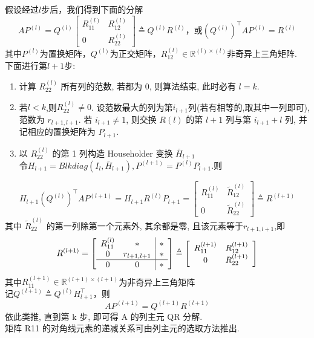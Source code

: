\documentclass[12pt,a4paper]{article}
\begin{document}
假设经过$l$步后，我们得到下面的分解
$$
A P^{(l)}=Q^{(l)}\left[\begin{array}{cc}{R_{11}^{(l)}} & {R_{12}^{(l)}} \\ {0} & {R_{22}^{(l)}}\end{array}\right] \triangleq Q^{(l)} R^{(l)}，或 \left(Q^{(l)}\right)^{\top} A P^{(l)}=R^{(l)}
$$
其中$P^(l)$为置换矩阵，$Q^(l)$为正交矩阵，$R_{12}^{(l)} \in \mathbb{R}^{(l) \times(l)}$非奇异上三角矩阵.\\
下面进行第$l+1$步:
\begin{enumerate}
\item 计算 $R_{22}^{(l)}$ 所有列的范数, 若都为 0, 则算法结束, 此时必有 $l = k$.
\item 若$l < k$,则$R_{22}^{(l)}\ne 0$. 设范数最大的列为第$i_{l+1}$列(若有相等的,取其中一列即可), 范数为 $r_{l+1,l+1}$. 若 $i_{l+1}\ne 1$, 则交换 $R(l)$ 的第 $l + 1$ 列与第 $i_{l+1} + l$ 列, 并记相应的置换矩阵为 $P_{l+1}$.
\item 以 $R_{22}^{(l)}$ 的第 1 列构造 Householder 变换 $\bar{H}_{l+1}$\\
令$H_{l+1}=Blkdiag(I_{l},\bar{H}_{l+1}),P^{(l+1)}=P^{(l)} P_{l+1}$.则
\end{enumerate}
$$
H_{l+1}\left(Q^{(l)}\right)^{\top} A P^{(l+1)}=H_{l+1} R^{(l)} P_{l+1}=\left[\begin{array}{cc}{R_{11}^{(l)}} & {\tilde{R}_{12}^{(l)}} \\ {0} & {\tilde{R}_{22}^{(l)}}\end{array}\right] \triangleq R^{(l+1)}
$$
其中 $\tilde {R}_{22}^{(l)}$ 的第一列除第一个元素外, 其余都是零, 且该元素等于$r_{l+1,l+1}$,即
$$
R^{(l+1)}=\left[\begin{array}{c c |c c}{R_{11}^{(l)}} & {*} & {*} \\ {0} & {r_{l+1, l+1}} & {*} \\ \hline {0} & {0} & {*}\end{array}\right] \triangleq\left[\begin{array}{cc}{R_{11}^{(l+1)}} & {R_{12}^{(l+1)}} \\ {0} & {R_{22}^{(l+1)}}\end{array}\right]
$$
其中$R_{11}^{(l+1)} \in \mathbb{R}^{(l+1) \times(l+1)}$为非奇异上三角矩阵\\
记$Q^{(l+1)} \triangleq Q^{(l)} H_{l+1}^{\top}$，则
$$
A P^{(l+1)}=Q^{(l+1)} R^{(l+1)}
$$
依此类推, 直到第 k 步, 即可得 A 的列主元 QR 分解.\\
矩阵 R11 的对角线元素的递减关系可由列主元的选取方法推出.
\end{document}
